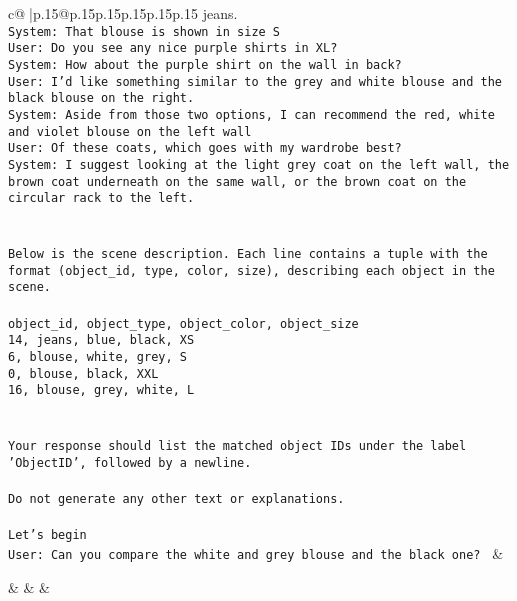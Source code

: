 \documentclass{article}
\begin{document}
{\begin{supertabular}{c@{$\;$}|p{.15\linewidth}@{}p{.15\linewidth}p{.15\linewidth}p{.15\linewidth}p{.15\linewidth}p{.15\linewidth}}
{{{jeans.\\ \tt System: That blouse is shown in size S\\ \tt User: Do you see any nice purple shirts in XL?\\ \tt System: How about the purple shirt on the wall in back?\\ \tt User: I'd like something similar to the grey and white blouse and the black blouse on the right.\\ \tt System: Aside from those two options, I can recommend the red, white and violet blouse on the left wall\\ \tt User: Of these coats, which goes with my wardrobe best?\\ \tt System: I suggest looking at the light grey coat on the left wall, the brown coat underneath on the same wall, or the brown coat on the circular rack to the left.\\ \tt \\ \tt \\ \tt Below is the scene description. Each line contains a tuple with the format (object_id, type, color, size), describing each object in the scene.\\ \tt \\ \tt object_id, object_type, object_color, object_size\\ \tt 14, jeans, blue, black, XS\\ \tt 6, blouse, white, grey, S\\ \tt 0, blouse, black, XXL\\ \tt 16, blouse, grey, white, L\\ \tt \\ \tt \\ \tt Your response should list the matched object IDs under the label 'ObjectID', followed by a newline.\\ \tt \\ \tt Do not generate any other text or explanations.\\ \tt \\ \tt Let's begin\\ \tt User: Can you compare the white and grey blouse and the black one? 
	  } 
	   } 
	   } 
	 & \\ 
 

    \theutterance {}  

    &  
	 & & \\ 
 


\end{supertabular}}
\end{document}
